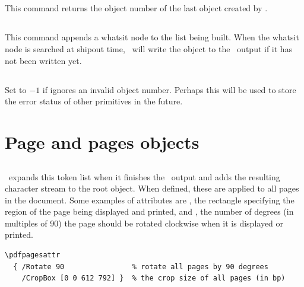 \documentclass{pdftexmanual}
\begin{document}
\subsection{}

This command returns the object number of the last object created by \type
{\pdfobj}.

\subsection{}

This command appends a whatsit node to the list being built. When the whatsit
node is searched at shipout time, \PDFTEX\ will write the object
to the \PDF\ output if it has not been written yet.

\subsection{}

Set to $-1$ if  ignores an invalid object number.  Perhaps
this will be used to store the error status of other primitives in the
future.

\section{Page and pages objects}

\subsection{}

\PDFTEX\ expands this token list when it finishes the \PDF\ output and
adds the resulting character stream to the root 
object. When defined, these are applied to all pages in the
document. Some examples of attributes are , the rectangle
specifying the region of the page being displayed and printed, and
, the number of degrees (in multiples of 90) the page
should be rotated clockwise when it is displayed or printed.

\begin{verbatim}
\pdfpagesattr
  { /Rotate 90                % rotate all pages by 90 degrees
    /CropBox [0 0 612 792] }  % the crop size of all pages (in bp)
\end{verbatim}
\end{document}

